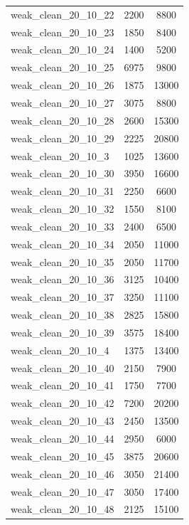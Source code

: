 \begin{longtable}{lcc}
weak\_clean\_20\_10\_22    &     2200 &   8800 \\
weak\_clean\_20\_10\_23    &     1850 &   8400 \\
weak\_clean\_20\_10\_24    &     1400 &   5200 \\
weak\_clean\_20\_10\_25    &     6975 &   9800 \\
weak\_clean\_20\_10\_26    &     1875 &  13000 \\
weak\_clean\_20\_10\_27    &     3075 &   8800 \\
weak\_clean\_20\_10\_28    &     2600 &  15300 \\
weak\_clean\_20\_10\_29    &     2225 &  20800 \\
weak\_clean\_20\_10\_3     &     1025 &  13600 \\
weak\_clean\_20\_10\_30    &     3950 &  16600 \\
weak\_clean\_20\_10\_31    &     2250 &   6600 \\
weak\_clean\_20\_10\_32    &     1550 &   8100 \\
weak\_clean\_20\_10\_33    &     2400 &   6500 \\
weak\_clean\_20\_10\_34    &     2050 &  11000 \\
weak\_clean\_20\_10\_35    &     2050 &  11700 \\
weak\_clean\_20\_10\_36    &     3125 &  10400 \\
weak\_clean\_20\_10\_37    &     3250 &  11100 \\
weak\_clean\_20\_10\_38    &     2825 &  15800 \\
weak\_clean\_20\_10\_39    &     3575 &  18400 \\
weak\_clean\_20\_10\_4     &     1375 &  13400 \\
weak\_clean\_20\_10\_40    &     2150 &   7900 \\
weak\_clean\_20\_10\_41    &     1750 &   7700 \\
weak\_clean\_20\_10\_42    &     7200 &  20200 \\
weak\_clean\_20\_10\_43    &     2450 &  13500 \\
weak\_clean\_20\_10\_44    &     2950 &   6000 \\
weak\_clean\_20\_10\_45    &     3875 &  20600 \\
weak\_clean\_20\_10\_46    &     3050 &  21400 \\
weak\_clean\_20\_10\_47    &     3050 &  17400 \\
weak\_clean\_20\_10\_48    &     2125 &  15100 \\

\end{longtable}
